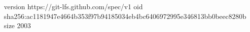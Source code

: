 version https://git-lfs.github.com/spec/v1
oid sha256:ac1181947e4664b353f97b94185034eb4bc6406972995e346813bb0beec8280b
size 2003
